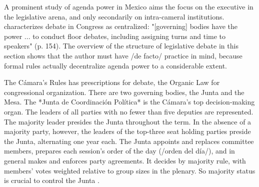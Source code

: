 \documentclass[letter,12pt]{article}
\begin{document}
A prominent study of agenda power in Mexico aims the focus on the executive in the legislative arena, and only secondarily on intra-cameral institutions. \citet{casar.agsetting.2016} characterizes debate in Congress as centralized: "[governing] bodies have the power ... to conduct floor debates, including assigning turns and time to speakers" (p. 154). The overview of the structure of legislative debate in this section shows that the author must have /de facto/ practice in mind, because formal rules actually decentralize agenda power to a considerable extent. 





The Cámara's Rules \citep{reglamentoDipMx.2019} has prescriptions for debate, the Organic Law \citep{loceum.2019} for congressional organization. There are two governing bodies, the Junta and the Mesa. The *Junta de Coordinación Política* is the Cámara's top decision-making organ. The leaders of all parties with no fewer than five deputies are represented. The majority leader presides the Junta throughout the term. In the absence of a majority party, however, the leaders of the top-three seat holding parties preside the Junta, alternating one year each. The Junta appoints and replaces committee members, prepares each session's order of the day (/orden del día/), and in general makes and enforces party agreements. It decides by majority rule, with members' votes weighted relative to group sizes in the plenary. So majority status is crucial to control the Junta \citep[cf.][]{cox.mccubbins.2005}.
\end{document}
